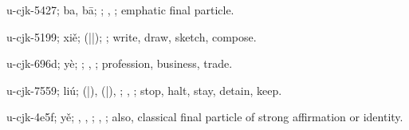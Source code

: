 \begin{multicols}{2}
{\cjkgGlue{}u-cjk-5427; ba, bā; \cjkgGlue{}; \cjkgGlue{}, \cjkgGlue{}; emphatic final particle.

\cjkgGlue{}u-cjk-5199; xiě; \cjkgGlue{}\cjkgGlue{}(\cjkgGlue{}|\cjkgGlue{}|\cjkgGlue{}); \cjkgGlue{}; write, draw, sketch, compose.

\cjkgGlue{}u-cjk-696d; yè; \cjkgGlue{}; \cjkgGlue{}, \cjkgGlue{}; profession, business, trade.

\cjkgGlue{}u-cjk-7559; liú; \cjkgGlue{}\cjkgGlue{}(\cjkgGlue{}|\cjkgGlue{}), \cjkgGlue{}\cjkgGlue{}(\cjkgGlue{}|\cjkgGlue{}), \cjkgGlue{}; \cjkgGlue{}, \cjkgGlue{}; stop, halt, stay, detain, keep.

\cjkgGlue{}u-cjk-4e5f; yě; \cjkgGlue{}, \cjkgGlue{}, \cjkgGlue{}; \cjkgGlue{}, \cjkgGlue{}; also, classical final particle of strong affirmation or identity.

}
\end{multicols}
